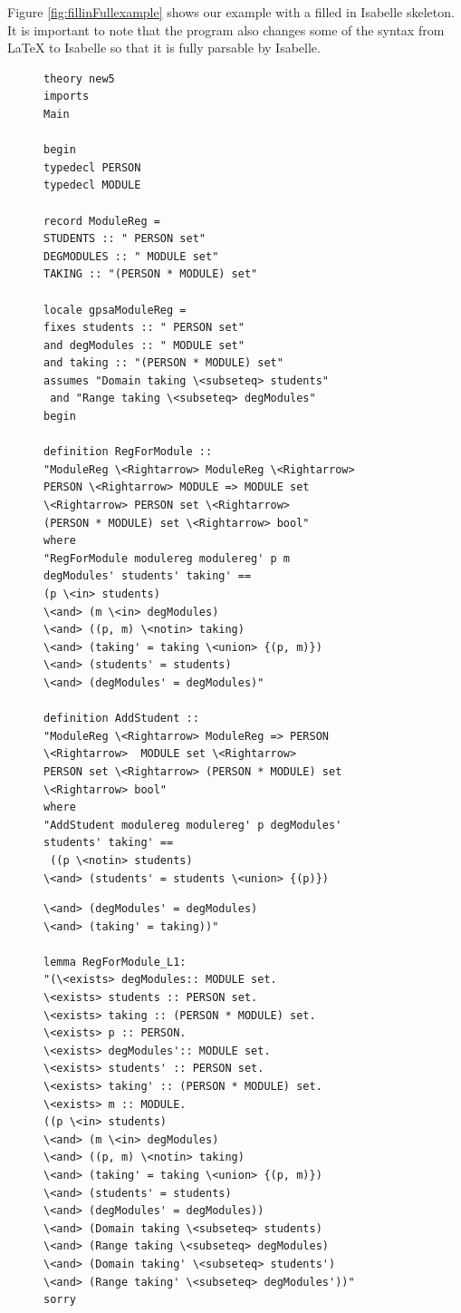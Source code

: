 Figure \ref{fig:fillinFullexample} shows our example with a filled in Isabelle skeleton. It is important to note that the program also changes some of the syntax from \LaTeX{} to Isabelle so that it is fully parsable by Isabelle.

\begin{figure}[H]
\centering
\begin{minipage}{0.45\textwidth}
\centering
\begin{scriptsize}
\begin{BVerbatim}
theory new5
imports 
Main 

begin 
typedecl PERSON 
typedecl MODULE

record ModuleReg = 
STUDENTS :: " PERSON set"
DEGMODULES :: " MODULE set"
TAKING :: "(PERSON * MODULE) set"

locale gpsaModuleReg = 
fixes students :: " PERSON set"
and degModules :: " MODULE set"
and taking :: "(PERSON * MODULE) set"
assumes "Domain taking \<subseteq> students" 
 and "Range taking \<subseteq> degModules"
begin

definition RegForModule :: 
"ModuleReg \<Rightarrow> ModuleReg \<Rightarrow>
PERSON \<Rightarrow> MODULE => MODULE set
\<Rightarrow> PERSON set \<Rightarrow> 
(PERSON * MODULE) set \<Rightarrow> bool"
where 
"RegForModule modulereg modulereg' p m
degModules' students' taking' ==
(p \<in> students) 
\<and> (m \<in> degModules) 
\<and> ((p, m) \<notin> taking)
\<and> (taking' = taking \<union> {(p, m)}) 
\<and> (students' = students) 
\<and> (degModules' = degModules)"

definition AddStudent :: 
"ModuleReg \<Rightarrow> ModuleReg => PERSON
\<Rightarrow>  MODULE set \<Rightarrow>
PERSON set \<Rightarrow> (PERSON * MODULE) set
\<Rightarrow> bool"
where 
"AddStudent modulereg modulereg' p degModules'
students' taking' ==
 ((p \<notin> students)
\<and> (students' = students \<union> {(p)}) 
\end{BVerbatim}
\end{scriptsize}
\end{minipage}\hfill
\begin{minipage}{0.45\textwidth}
\begin{scriptsize}
\begin{BVerbatim}
\<and> (degModules' = degModules) 
\<and> (taking' = taking))"

lemma RegForModule_L1:
"(\<exists> degModules:: MODULE set.
\<exists> students :: PERSON set.
\<exists> taking :: (PERSON * MODULE) set.
\<exists> p :: PERSON.
\<exists> degModules':: MODULE set.
\<exists> students' :: PERSON set.
\<exists> taking' :: (PERSON * MODULE) set.
\<exists> m :: MODULE.
((p \<in> students) 
\<and> (m \<in> degModules) 
\<and> ((p, m) \<notin> taking)
\<and> (taking' = taking \<union> {(p, m)}) 
\<and> (students' = students) 
\<and> (degModules' = degModules))
\<and> (Domain taking \<subseteq> students)
\<and> (Range taking \<subseteq> degModules)
\<and> (Domain taking' \<subseteq> students')
\<and> (Range taking' \<subseteq> degModules'))"
sorry


\end{BVerbatim}
\end{scriptsize}
\end{minipage}
\end{figure}

